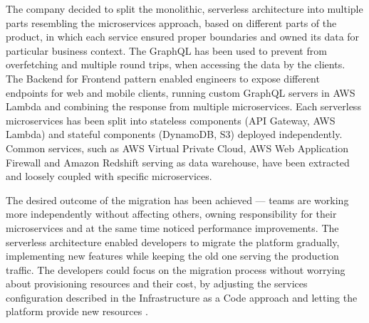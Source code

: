 The company decided to split the monolithic, serverless architecture into multiple parts resembling the microservices approach, based on different parts of the product, in which each service ensured proper boundaries and owned its data for particular business context.
The GraphQL has been used to prevent from overfetching and multiple round trips, when accessing the data by the clients.
The Backend for Frontend pattern enabled engineers to expose different endpoints for web and mobile clients, running custom GraphQL servers in AWS Lambda and combining the response from multiple microservices.
Each serverless microservices has been split into stateless components (API Gateway, AWS Lambda) and stateful components (DynamoDB, S3) deployed independently.
Common services, such as AWS Virtual Private Cloud, AWS Web Application Firewall and Amazon Redshift serving as data warehouse, have been extracted and loosely coupled with specific microservices.

The desired outcome of the migration has been achieved --- teams are working more independently without affecting others, owning responsibility for their microservices and at the same time noticed performance improvements.
The serverless architecture enabled developers to migrate the platform gradually, implementing new features while keeping the old one serving the production traffic.
The developers could focus on the migration process without worrying about provisioning resources and their cost, by adjusting the services configuration described in the Infrastructure as a Code approach and letting the platform provide new resources \cite{ServerlessArchitectureOnAWS}.






